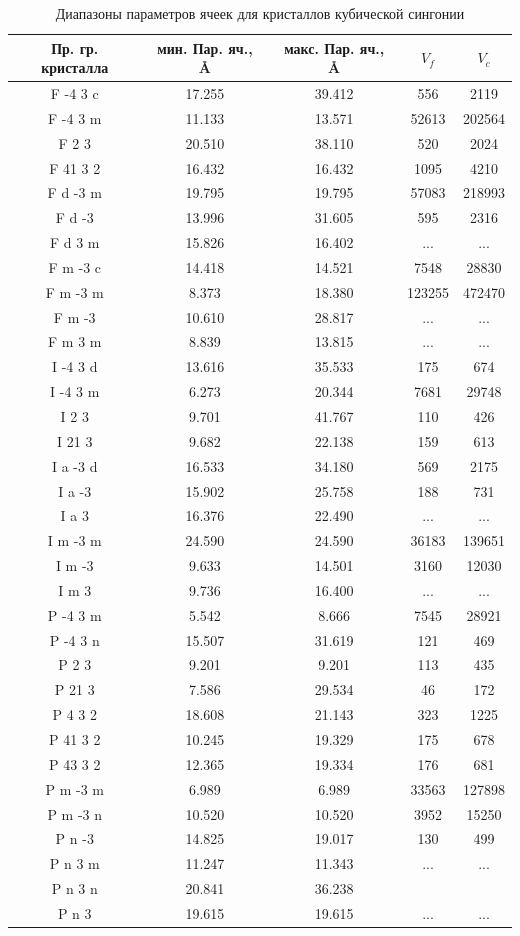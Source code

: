 \documentclass[12pt,a4paper, russian]{extarticle}
\begin{document}
\label{tab:symmetry}
\begin{table}[H]
\begin{tabular}{c|c|c|c|c}
Пр. гр. кристалла & мин. Пар. яч., \AA & макс. Пар. яч., \AA & $V_f$ & $V_c$\\
\hline
F -4 3 c & 17.255 & 39.412 & 556 & 2119 \\
F -4 3 m & 11.133 & 13.571 & 52613 & 202564 \\
F 2 3 & 20.510 & 38.110 & 520 & 2024\\
F 41 3 2 & 16.432 & 16.432 & 1095 & 4210\\
F d -3 m & 19.795 & 19.795 & 57083 & 218993 \\
F d -3 & 13.996 & 31.605 & 595 & 2316 \\
F d 3 m & 15.826 & 16.402 & ... & ...\\
F m -3 c & 14.418 & 14.521 & 7548 & 28830 \\
F m -3 m & 8.373 & 18.380 & 123255 & 472470 \\
F m -3 & 10.610 & 28.817 & ... & ... \\
F m 3 m & 8.839 & 13.815 & ... & ...\\
I -4 3 d & 13.616 & 35.533 & 175 & 674 \\
I -4 3 m & 6.273 & 20.344 & 7681 & 29748\\
I 2 3 & 9.701 & 41.767 & 110 & 426 \\
I 21 3 & 9.682 & 22.138 & 159 & 613\\
I a -3 d & 16.533 & 34.180 & 569 & 2175\\
I a -3 & 15.902 & 25.758 & 188 & 731 \\
I a 3 & 16.376 & 22.490 & ... & ...\\
I m -3 m & 24.590 & 24.590 & 36183 & 139651 \\
I m -3 & 9.633 & 14.501 & 3160 & 12030\\
I m 3 & 9.736 & 16.400 & ... & ...\\
P -4 3 m & 5.542 & 8.666 & 7545 & 28921\\
P -4 3 n & 15.507 & 31.619 & 121 & 469\\
P 2 3 & 9.201 & 9.201 & 113& 435\\
P 21 3 & 7.586 & 29.534 & 46 & 172 \\
P 4 3 2 & 18.608 & 21.143 & 323 & 1225\\
P 41 3 2 & 10.245 & 19.329 & 175 & 678\\
P 43 3 2 & 12.365 & 19.334 & 176 & 681 \\
P m -3 m & 6.989 & 6.989 & 33563 & 127898 \\
P m -3 n & 10.520 & 10.520 & 3952 & 15250 \\
P n -3 & 14.825 & 19.017 & 130 & 499 \\
P n 3 m & 11.247 & 11.343 & ... & ...\\
P n 3 n & 20.841 & 36.238 \\
P n 3 & 19.615 & 19.615 & ... & ...
\end{tabular}
\caption{Диапазоны параметров ячеек для кристаллов кубической сингонии}
\end{table}
\end{document}
